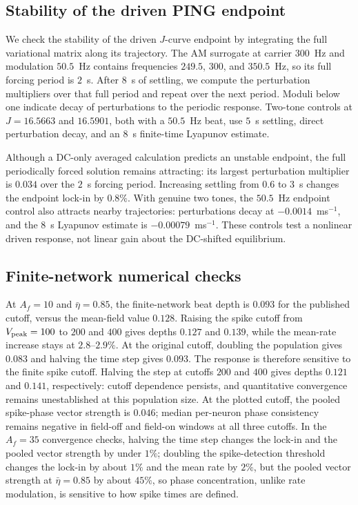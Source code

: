 \ifjne



\fi

\subsection{Stability of the driven PING endpoint}\label{app:ping-stability}
We check the stability of the driven $J$-curve endpoint by integrating the full
variational matrix along its trajectory. The AM surrogate at carrier $300$~Hz
and modulation $50.5$~Hz contains frequencies $249.5$, $300$, and $350.5$~Hz,
so its full forcing period is $2$~s. After $8$~s of settling, we compute the
perturbation multipliers over that full period and repeat over the next period.
Moduli below one indicate decay of perturbations to the periodic response.
Two-tone controls at $J=16.5663$ and $16.5901$, both with a $50.5$~Hz beat,
use $5$~s settling, direct perturbation decay, and an $8$~s finite-time
Lyapunov estimate.

Although a DC-only averaged calculation predicts an unstable endpoint, the full
periodically forced solution remains attracting: its largest perturbation
multiplier is $0.034$ over the $2$~s forcing period. Increasing settling from
$0.6$ to $3$~s changes the endpoint lock-in by $0.8\%$. With genuine two tones,
the $50.5$~Hz endpoint control also attracts nearby trajectories: perturbations
decay at $-0.0014$~ms$^{-1}$, and the $8$~s Lyapunov estimate is
$-0.00079$~ms$^{-1}$. These controls test a nonlinear driven response, not linear
gain about the DC-shifted equilibrium.

\subsection{Finite-network numerical checks}\label{app:qif-checks}
At $A_f=10$ and $\bar\eta=0.85$, the finite-network beat depth is $0.093$
for the published cutoff, versus the mean-field value $0.128$. Raising the spike cutoff from $V_{\rm peak}=100$ to
$200$ and $400$ gives depths $0.127$ and $0.139$, while the mean-rate increase
stays at $2.8$--$2.9\%$. At the original cutoff, doubling the population gives
$0.083$ and halving the time step gives $0.093$. The response is therefore
sensitive to the finite spike cutoff. Halving the step at cutoffs $200$ and
$400$ gives depths $0.121$ and $0.141$, respectively: cutoff dependence persists,
and quantitative convergence remains unestablished at this population size.
At the plotted cutoff, the pooled spike-phase vector strength is $0.046$;
median per-neuron phase consistency remains negative in field-off and field-on
windows at all three cutoffs.
In the $A_f=35$ convergence checks, halving the time step changes the lock-in and the pooled vector
strength by under $1\%$; doubling the spike-detection threshold changes the lock-in by
about $1\%$ and the mean rate by $2\%$, but the pooled vector strength at
$\bar\eta=0.85$ by about $45\%$, so phase concentration, unlike rate modulation, is sensitive to
how spike times are defined.


